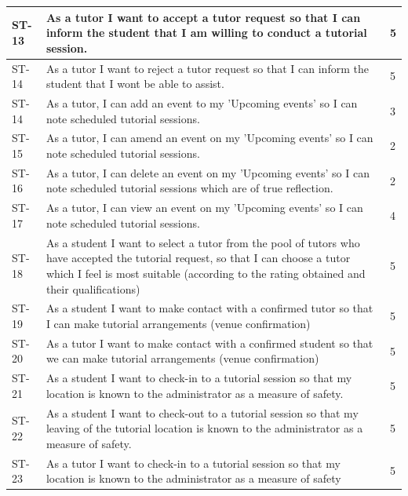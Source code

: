 \documentclass[12pt]{article}
\begin{document}
{{\begin{longtable}{| l | p{10cm}| l |}
			\\ \hline ST-13 & As a tutor I want to accept a tutor request so that I can inform the student that I am willing to conduct a tutorial session. &5

						\\ \hline ST-14 & As a tutor I want to  reject a tutor request so that I can inform the student that I wont be able to assist.   & 5

			\\ \hline ST-14 & As a tutor, I can  add an event to my 'Upcoming events' so I can note scheduled tutorial sessions.  & 3

			\\ \hline ST-15 & As a tutor, I can  amend an event on my 'Upcoming events' so I can note scheduled tutorial sessions.  & 2

			\\ \hline ST-16 & As a tutor, I can  delete an event on my 'Upcoming events' so I can note scheduled tutorial sessions which are of true reflection. & 2

			\\ \hline ST-17 & As a tutor, I can  view an event on my 'Upcoming events'   so I can note scheduled tutorial sessions. & 4

			\\ \hline ST-18 & As a student I want to select a tutor from the pool of tutors who have accepted the tutorial request, so that I can choose a tutor which I feel is most suitable (according to the rating obtained and their qualifications)  &5

			\\ \hline ST-19 & As a student I want to make contact with a confirmed tutor so that I can make tutorial arrangements (venue confirmation) &5

			\\ \hline ST-20 &As a tutor I want to make contact with a confirmed student so that we can make tutorial arrangements (venue confirmation)  &5

			\\ \hline ST-21 & As a student I want to check-in to a tutorial session so that my location is known to the administrator as a measure of safety.  &5

			\\ \hline ST-22 & As a student I want to check-out to a tutorial session so that my leaving of the tutorial location is known to the administrator as a measure of safety.   &5

			\\ \hline ST-23 & As a tutor I want to check-in to a tutorial session so that my location is known to the administrator as a measure of safety  &5


\end{longtable}}}
\end{document}
